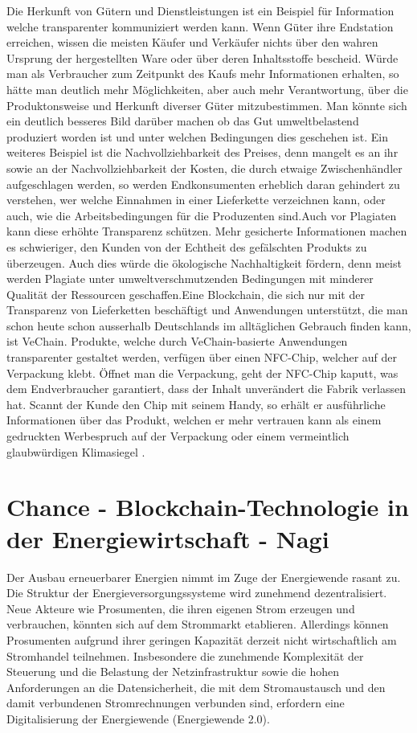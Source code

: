 Die Herkunft von Gütern und Dienstleistungen ist ein Beispiel für Information welche transparenter kommuniziert werden kann. Wenn Güter ihre Endstation erreichen, wissen die meisten Käufer und Verkäufer nichts über den wahren Ursprung der hergestellten Ware oder über deren Inhaltsstoffe bescheid. Würde man als Verbraucher zum Zeitpunkt des Kaufs mehr Informationen erhalten, so hätte man deutlich mehr Möglichkeiten, aber auch mehr Verantwortung, über die Produktonsweise und Herkunft diverser Güter mitzubestimmen. Man könnte sich ein deutlich besseres Bild darüber machen ob das Gut umweltbelastend produziert worden ist und unter welchen Bedingungen dies geschehen ist. \newline Ein weiteres Beispiel ist die Nachvollziehbarkeit des Preises, denn mangelt es an ihr sowie an der Nachvollziehbarkeit der Kosten, die durch etwaige Zwischenhändler aufgeschlagen werden, so werden Endkonsumenten erheblich daran gehindert zu verstehen, wer welche Einnahmen in einer Lieferkette verzeichnen kann, oder auch, wie die Arbeitsbedingungen für die Produzenten sind\cite{lieferkette}.\newline Auch vor Plagiaten kann diese erhöhte Transparenz schützen. Mehr gesicherte Informationen machen es schwieriger, den Kunden von der Echtheit des gefälschten Produkts zu überzeugen. Auch dies würde die ökologische Nachhaltigkeit fördern, denn meist werden Plagiate unter umweltverschmutzenden Bedingungen mit minderer Qualität der Ressourcen geschaffen.\newline Eine Blockchain, die sich nur mit der Transparenz von Lieferketten beschäftigt und Anwendungen unterstützt, die man schon heute schon ausserhalb Deutschlands im alltäglichen Gebrauch finden kann, ist VeChain. Produkte, welche durch VeChain-basierte Anwendungen transparenter gestaltet werden, verfügen über einen NFC-Chip, welcher auf der Verpackung klebt. Öffnet man die Verpackung, geht der NFC-Chip kaputt, was dem Endverbraucher garantiert, dass der Inhalt unverändert die Fabrik verlassen hat. Scannt der Kunde den Chip mit seinem Handy, so erhält er ausführliche Informationen über das Produkt, welchen er mehr vertrauen kann als einem gedruckten Werbespruch auf der Verpackung oder einem vermeintlich glaubwürdigen Klimasiegel \cite{vechain}\cite{veDoc}.
\section{Chance - Blockchain-Technologie in der Energiewirtschaft - Nagi}
Der Ausbau erneuerbarer Energien nimmt im Zuge der Energiewende rasant zu. Die Struktur der Energieversorgungssysteme wird zunehmend dezentralisiert. Neue Akteure wie Prosumenten, die ihren eigenen Strom erzeugen und verbrauchen, könnten sich auf dem Strommarkt etablieren. Allerdings können Prosumenten aufgrund ihrer geringen Kapazität derzeit nicht wirtschaftlich am Stromhandel teilnehmen. Insbesondere die zunehmende Komplexität der Steuerung und die Belastung der Netzinfrastruktur sowie die hohen Anforderungen an die Datensicherheit, die mit dem Stromaustausch und den damit verbundenen Stromrechnungen verbunden sind, erfordern eine Digitalisierung der Energiewende (Energiewende 2.0).
\newline


